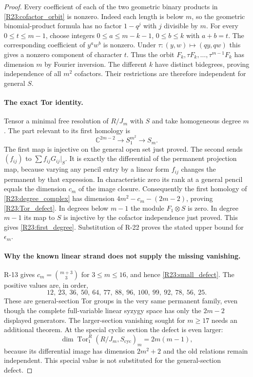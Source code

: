 \documentclass[11pt,a4paper]{article}
\theoremstyle{definition}\newtheorem{definition}{Definition}
\begin{document}
\begin{proof}
Every coefficient of each of the two geometric binary products in
\eqref{R23:cofactor_orbit} is nonzero. Indeed each length is below
$m$, so the geometric binomial-product formula has no factor
$1-q^j$ with $j$ divisible by $m$. For every
$0\leq t\leq m-1$, choose integers
$0\leq a\leq m-k-1$, $0\leq b\leq k$ with $a+b=t$.
The corresponding coefficient of $y^aw^b$ is nonzero. Under
$\tau:(y,w)\mapsto(qy,qw)$ this gives a nonzero component of
character $t$. Thus the orbit
$F_k,\tau F_k,\ldots,\tau^{m-1}F_k$ has dimension $m$ by Fourier
inversion. The different $k$ have distinct bidegrees, proving
independence of all $m^2$ cofactors. Their restrictions are therefore
independent for general $S$.

\paragraph{The exact Tor identity.}
Tensor a minimal free resolution of $R/J_m$ with $S$ and take
homogeneous degree $m$. The part relevant to its first homology is
\begin{equation}\label{R23:degree_complex}
 \mathbb C^{2m-2}\longrightarrow
                 S_1^{m^2}\longrightarrow S_m.
\end{equation}
The first map is injective on the general open set just proved.
The second sends $(f_{ij})$ to
$\sum f_{ij}G_{ij}|_S$. It is exactly the differential of the
permanent projection map, because varying any pencil entry by a
linear form $f_{ij}$ changes the permanent by that expression.
In characteristic zero its rank at a general pencil equals the
dimension $c_m$ of the image closure. Consequently the first
homology of \eqref{R23:degree_complex} has dimension
$4m^2-c_m-(2m-2)$, proving \eqref{R23:Tor_defect}.
In degrees below $m-1$ the module $F_1\otimes S$ is zero. In degree
$m-1$ its map to $S$ is injective by the cofactor independence just
proved. This gives \eqref{R23:first_degree}.
Substitution of R-22 proves the stated upper bound for $\epsilon_m$.

\paragraph{Why the known linear strand does not supply the missing vanishing.}
R-13 gives $c_m=\binom{m+3}{3}$ for $3\leq m\leq16$,
and hence \eqref{R23:small_defect}. The positive values are, in order,
\[
 12,\ 23,\ 36,\ 50,\ 64,\ 77,\ 88,\ 96,\ 100,\ 99,\ 92,\ 78,\ 56,\ 25.
\]
These are general-section Tor groups in the very same permanent
family, even though the complete full-variable linear syzygy space
has only the $2m-2$ displayed generators. The larger-section
vanishing sought for $m\geq17$ needs an additional theorem.
At the special cyclic section the defect is even larger:
\[
 \dim\operatorname{Tor}_1^R(R/J_m,S_{\mathrm{cyc}})_m
 =2m(m-1),
\]
because its differential image has dimension $2m^2+2$ and the old
relations remain independent. This special value is not substituted
for the general-section defect.


\end{proof}
\end{document}
